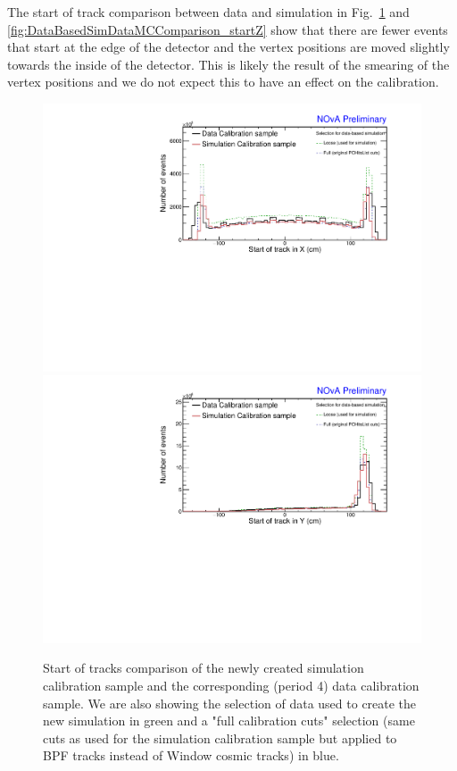 The start of track comparison between data and simulation in Fig.~\ref{fig:DataBasedSimDataMCComparison_startXstartY} and \ref{fig:DataBasedSimDataMCComparison_startZ} show that there are fewer events that start at the edge of the detector and the vertex positions are moved slightly towards the inside of the detector. This is likely the result of the smearing of the vertex positions and we do not expect this to have an effect on the calibration. 

\begin{figure}[!ht]
\includegraphics[width=\textwidth]{Plots/TBCalibration/DBSim_DataMCComparison_StartX.pdf}
\includegraphics[width=\textwidth]{Plots/TBCalibration/DBSim_DataMCComparison_StartY.pdf}
\caption[Data-Simulation comparison of track start distributions]{Start of tracks comparison of the newly created simulation calibration sample and the corresponding (period 4) data calibration sample. We are also showing the selection of data used to create the new simulation in green and a "full calibration cuts" selection (same cuts as used for the simulation calibration sample but applied to \acrshort{BPF} tracks instead of Window cosmic tracks) in blue.}
\label{fig:DataBasedSimDataMCComparison_startXstartY}
\end{figure}

